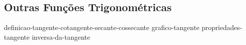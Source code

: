 \subsection{Outras Funções Trigonométricas}

{definicao-tangente-cotangente-secante-cossecante}
{grafico-tangente}
{propriedades-tangente}
{inversa-da-tangente}